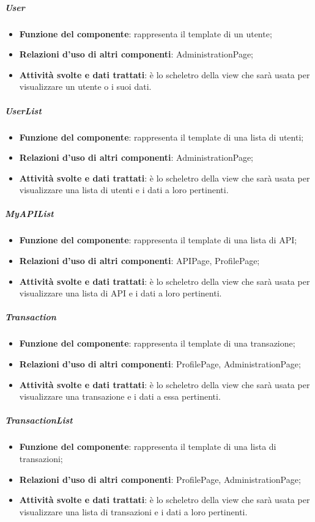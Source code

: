 \subparagraph{User}
\begin{itemize}
	\item \textbf{Funzione del componente}: rappresenta il template di un utente;
	\item \textbf{Relazioni d’uso di altri componenti}: AdministrationPage;
	\item \textbf{Attività svolte e dati trattati}: \`{e} lo scheletro della view che sar\`{a} usata per visualizzare un utente o i suoi dati.
\end{itemize}

\subparagraph{UserList}
\begin{itemize}
	\item \textbf{Funzione del componente}: rappresenta il template di una lista di utenti;
	\item \textbf{Relazioni d’uso di altri componenti}: AdministrationPage;
	\item \textbf{Attività svolte e dati trattati}: \`{e} lo scheletro della view che sar\`{a} usata per visualizzare una lista di utenti e i dati a loro pertinenti.
\end{itemize}

\subparagraph{MyAPIList}
\begin{itemize}
	\item \textbf{Funzione del componente}: rappresenta il template di una lista di API;
	\item \textbf{Relazioni d’uso di altri componenti}: APIPage, ProfilePage;
	\item \textbf{Attività svolte e dati trattati}: \`{e} lo scheletro della view che sar\`{a} usata per visualizzare una lista di API e i dati a loro pertinenti.
\end{itemize}

\subparagraph{Transaction}
\begin{itemize}
	\item \textbf{Funzione del componente}: rappresenta il template di una transazione;
	\item \textbf{Relazioni d’uso di altri componenti}: ProfilePage, AdministrationPage;
	\item \textbf{Attività svolte e dati trattati}: \`{e} lo scheletro della view che sar\`{a} usata per visualizzare una transazione e i dati a essa pertinenti.
\end{itemize}

\subparagraph{TransactionList}
\begin{itemize}
	\item \textbf{Funzione del componente}: rappresenta il template di una lista di transazioni;
	\item \textbf{Relazioni d’uso di altri componenti}: ProfilePage, AdministrationPage;
	\item \textbf{Attività svolte e dati trattati}: \`{e} lo scheletro della view che sar\`{a} usata per visualizzare una lista di transazioni e i dati a loro pertinenti.
\end{itemize}


